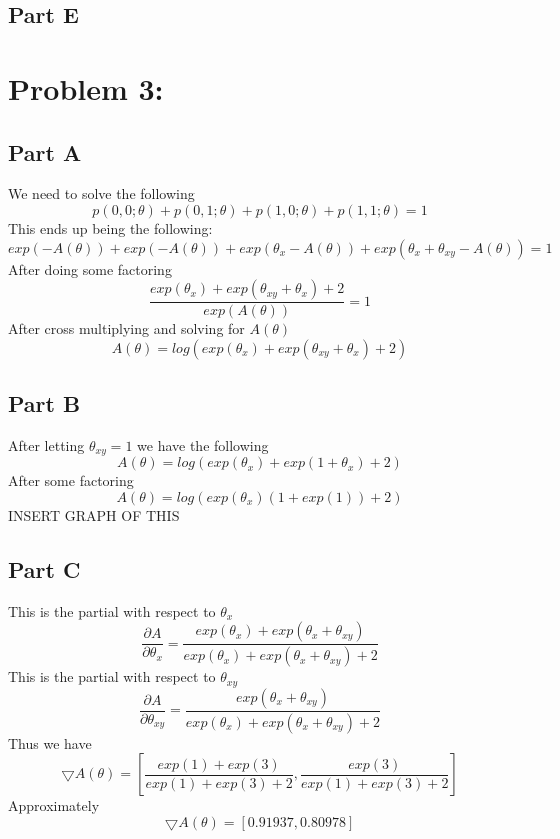 \documentclass[twoside,11pt]{article}
\theoremstyle{definition}
\begin{document}
\subsection*{Part E}

\section*{Problem 3: }

\subsection*{Part A}

We need to solve the following
\[
p(0,0;\theta) + p(0,1;\theta) + p(1,0;\theta) + p(1,1;\theta) = 1
\]
This ends up being the following:
\[
exp(-A(\theta)) + exp(-A(\theta)) + exp(\theta_x - A(\theta)) + exp(\theta_x + \theta_{xy} - A(\theta)) = 1
\]
After doing some factoring
\[
\frac{exp(\theta_x) + exp(\theta_{xy} + \theta_x) + 2}{exp(A(\theta))} = 1
\]
After cross multiplying and solving for $A(\theta)$
\[
A(\theta) = log( exp(\theta_x) + exp(\theta_{xy} + \theta_x) + 2 )
\]

\subsection*{Part B}
After letting $\theta_{xy} = 1$ we have the following
\[
A(\theta) = log( exp(\theta_x) + exp(1 + \theta_x) + 2 )
\]
After some factoring
\[
A(\theta) = log( exp(\theta_x)(1 + exp(1) ) + 2 )
\]
INSERT GRAPH OF THIS

\subsection*{Part C}
This is the partial with respect to $\theta_x$
\[
\frac{\partial A}{\partial \theta_x} = \frac{exp(\theta_x) + exp(\theta_x + \theta_{xy})}{exp(\theta_x) + exp(\theta_x + \theta_{xy}) + 2}
\]
This is the partial with respect to $\theta_{xy}$
\[
\frac{\partial A}{\partial \theta_{xy}} = \frac{exp(\theta_x + \theta_{xy})}{exp(\theta_x) + exp(\theta_x + \theta_{xy}) + 2}
\]
Thus we have 
\[
\bigtriangledown A(\theta) = [\frac{exp(1)+exp(3)}{exp(1)+exp(3)+2},\frac{exp(3)}{exp(1)+exp(3)+2}]
\]
Approximately 
\[
\bigtriangledown A(\theta) = [0.91937,0.80978]
\]
\end{document}
